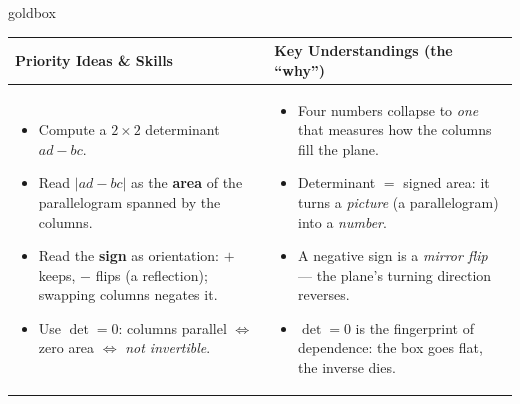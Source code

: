 \documentclass[10pt]{article}
\begin{document}
\renewcommand{\arraystretch}{1.4}
\begin{skillbox}{goldbox}
\begin{tabularx}{\linewidth}{@{}X|X@{}}
\textbf{Priority Ideas \& Skills} & \textbf{Key Understandings (the ``why'')} \\[2pt]
\hline
\vspace{-6pt}
\begin{itemize}[leftmargin=1.1em, nosep, after=\vspace{2pt}]
  \item Compute a $2\times2$ determinant $ad-bc$.
  \item Read $|ad-bc|$ as the \textbf{area} of the parallelogram spanned by the columns.
  \item Read the \textbf{sign} as orientation: $+$ keeps, $-$ flips (a reflection); swapping columns negates it.
  \item Use $\det=0$: columns parallel $\Leftrightarrow$ zero area $\Leftrightarrow$ \emph{not invertible}.
\end{itemize}
&
\vspace{-6pt}
\begin{itemize}[leftmargin=1.1em, nosep, after=\vspace{2pt}]
  \item Four numbers collapse to \emph{one} that measures how the columns fill the plane.
  \item Determinant $=$ signed area: it turns a \emph{picture} (a parallelogram) into a \emph{number}.
  \item A negative sign is a \emph{mirror flip} --- the plane's turning direction reverses.
  \item $\det=0$ is the fingerprint of dependence: the box goes flat, the inverse dies.
\end{itemize}
\end{tabularx}
\end{skillbox}
\end{document}
